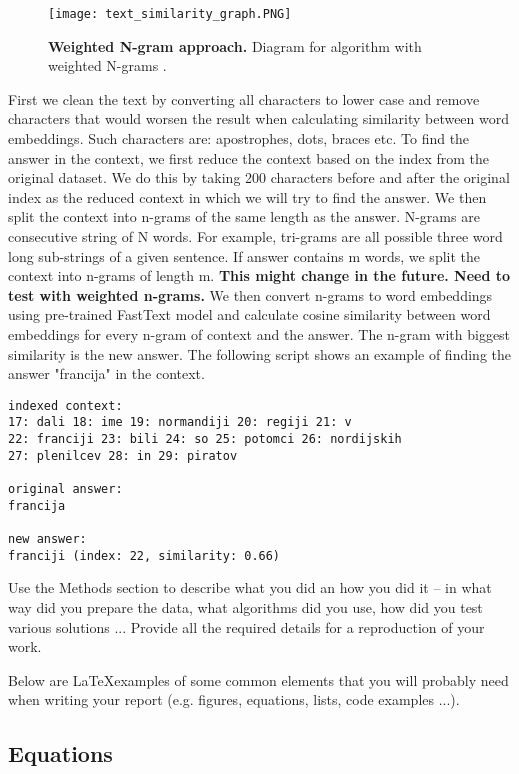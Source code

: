 \documentclass[fleqn,moreauthors,10pt]{ds_report}
\begin{document}
\begin{figure}[ht]\centering
	\texttt{[image: text\_similarity\_graph.PNG]}
	\caption{\textbf{Weighted N-gram approach.} Diagram for algorithm with weighted N-grams \cite{dudekula2019}.}
	\label{fig:column}
\end{figure}

First we clean the text by converting all characters to lower case and remove characters that would worsen the result when calculating similarity between word embeddings. Such characters are: apostrophes, dots, braces etc. To find the answer in the context, we first reduce the context based on the index from the original dataset. We do this by taking 200 characters before and after the original index as the reduced context in which we will try to find the answer. We then split the context into n-grams of the same length as the answer. N-grams are consecutive string of N words. For example, tri-grams are all possible three word long sub-strings of a given sentence. If answer contains m words, we split the context into n-grams of length m. \textbf{This might change in the future. Need to test with weighted n-grams.} We then convert n-grams to word embeddings using pre-trained FastText \cite{bojanowski2017enriching} model and calculate cosine similarity between word embeddings for every n-gram of context and the answer. The n-gram with biggest similarity is the new answer. The following script shows an example of finding the answer "francija" in the context.

\scriptsize
\begin{verbatim}
indexed context:
17: dali 18: ime 19: normandiji 20: regiji 21: v 
22: franciji 23: bili 24: so 25: potomci 26: nordijskih
27: plenilcev 28: in 29: piratov

original answer: 
francija

new answer: 
franciji (index: 22, similarity: 0.66)
\end{verbatim}
\normalsize



Use the Methods section to describe what you did an how you did it -- in what way did you prepare the data, what algorithms did you use, how did you test various solutions ... Provide all the required details for a reproduction of your work.

Below are \LaTeX examples of some common elements that you will probably need when writing your report (e.g. figures, equations, lists, code examples ...).


\subsection*{Equations}
\end{document}
